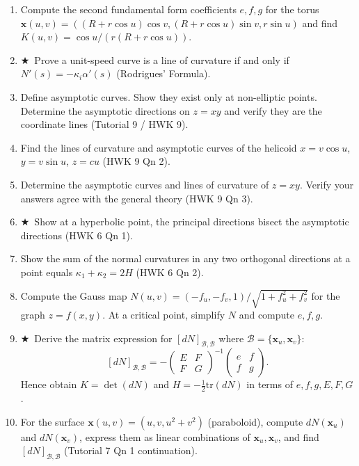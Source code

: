 \documentclass[11pt, a4paper]{article}
\newcommand{\kp}{\kappa}
\newcommand{\hard}{$\bigstar$\ }
\begin{document}
\begin{enumerate}[label=\textbf{Q\arabic*.}, leftmargin=*, itemsep=6pt]
\item Compute the second fundamental form coefficients $e,f,g$ for the torus $\mathbf{x}(u,v)=((R+r\cos u)\cos v,(R+r\cos u)\sin v,r\sin u)$ and find $K(u,v)=\cos u/(r(R+r\cos u))$.

\item \hard Prove a unit-speed curve is a line of curvature if and only if $N'(s)=-\kp_i\alpha'(s)$ (Rodrigues' Formula).

\item Define asymptotic curves. Show they exist only at non-elliptic points. Determine the asymptotic directions on $z=xy$ and verify they are the coordinate lines (Tutorial 9 / HWK 9).

\item Find the lines of curvature and asymptotic curves of the helicoid $x=v\cos u$, $y=v\sin u$, $z=cu$ (HWK 9 Qn 2).

\item Determine the asymptotic curves and lines of curvature of $z=xy$. Verify your answers agree with the general theory (HWK 9 Qn 3).

\item \hard Show at a hyperbolic point, the principal directions bisect the asymptotic directions (HWK 6 Qn 1).

\item Show the sum of the normal curvatures in any two orthogonal directions at a point equals $\kp_1+\kp_2=2H$ (HWK 6 Qn 2).

\item Compute the Gauss map $N(u,v)=(-f_u,-f_v,1)/\sqrt{1+f_u^2+f_v^2}$ for the graph $z=f(x,y)$. At a critical point, simplify $N$ and compute $e,f,g$.

\item \hard Derive the matrix expression for $[dN]_{\mathcal{B},\mathcal{B}}$ where $\mathcal{B}=\{\mathbf{x}_u,\mathbf{x}_v\}$:
\[
  [dN]_{\mathcal{B},\mathcal{B}} = -\begin{pmatrix}E&F\\F&G\end{pmatrix}^{-1}\begin{pmatrix}e&f\\f&g\end{pmatrix}.
\]
Hence obtain $K=\det(dN)$ and $H=-\tfrac{1}{2}\mathrm{tr}(dN)$ in terms of $e,f,g,E,F,G$.

\item For the surface $\mathbf{x}(u,v)=(u,v,u^2+v^2)$ (paraboloid), compute $dN(\mathbf{x}_u)$ and $dN(\mathbf{x}_v)$, express them as linear combinations of $\mathbf{x}_u,\mathbf{x}_v$, and find $[dN]_{\mathcal{B},\mathcal{B}}$ (Tutorial 7 Qn 1 continuation).


\end{enumerate}
\end{document}

